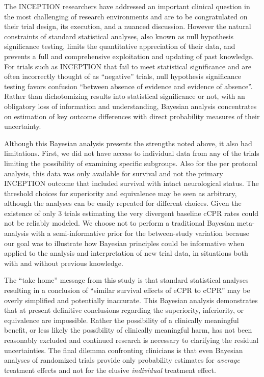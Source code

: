 \documentclass[
  super,
  preprint,
  3p]{elsarticle}
\begin{document}
The INCEPTION researchers have addressed an important clinical question
in the most challenging of research environments and are to be
congratulated on their trial design, its execution, and a nuanced
discussion. However the natural constraints of standard statistical
analyses, also known as null hypothesis significance testing, limits the
quantitative appreciation of their data, and prevents a full and
comprehensive exploitation and updating of past knowledge. For trials
such as INCEPTION that fail to meet statistical significance and are
often incorrectly thought of as ``negative'' trials, null hypothesis
significance testing favors confusion ``between absence of evidence and
evidence of absence''\citep{RN6765}. Rather than dichotomizing results
into statistical significance or not, with an obligatory loss of
information and understanding, Bayesian analysis concentrates on
estimation of key outcome differences with direct probability measures
of their uncertainty.

Although this Bayesian analysis presents the strengths noted above, it
also had limitations. First, we did not have access to individual data
from any of the trials limiting the possibility of examining specific
subgroups. Also for the per protocol analysis, this data was only
available for survival and not the primary INCEPTION outcome that
included survival with intact neurological status. The threshold choices
for superiority and equivalence may be seen as arbitrary, although the
analyses can be easily repeated for different choices. Given the
existence of only 3 trials estimating the very divergent baseline cCPR
rates could not be reliably modeled. We choose not to perform a
traditional Bayesian meta-analysis with a semi-informative prior for the
between-study variation because our goal was to illustrate how Bayesian
principles could be informative when applied to the analysis and
interpretation of new trial data, in situations both with and without
previous knowledge.

The ``take home'' message from this study is that standard statistical
analyses resulting in a conclusion of ``similar survival effects of eCPR
to cCPR'' may be overly simplified and potentially inaccurate. This
Bayesian analysis demonstrates that at present definitive conclusions
regarding the superiority, inferiority, or equivalence are impossible.
Rather the possibility of a clinically meaningful benefit, or less
likely the possibility of clinically meaningful harm, has not been
reasonably excluded and continued research is necessary to clarifying
the residual uncertainties. The final dilemma confronting clinicians is
that even Bayesian analyses of randomized trials provide only
probability estimates for \emph{average} treatment effects and not for
the elusive \emph{individual} treatment effect.
\end{document}
